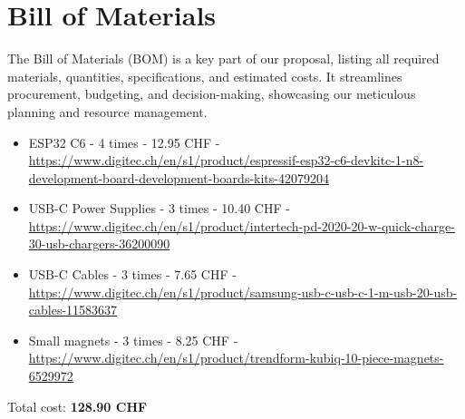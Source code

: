 \section{Bill of Materials}

The Bill of Materials (BOM) is a key part of our proposal, listing all required materials, quantities, specifications, and estimated costs.
It streamlines procurement, budgeting, and decision-making, showcasing our meticulous planning and resource management.

\begin{itemize}
    \item ESP32 C6 - 4 times - 12.95 CHF - \url{https://www.digitec.ch/en/s1/product/espressif-esp32-c6-devkitc-1-n8-development-board-development-boards-kits-42079204}
    \item USB-C Power Supplies - 3 times - 10.40 CHF - \url{https://www.digitec.ch/en/s1/product/intertech-pd-2020-20-w-quick-charge-30-usb-chargers-36200090}
    \item USB-C Cables - 3 times - 7.65 CHF - \url{https://www.digitec.ch/en/s1/product/samsung-usb-c-usb-c-1-m-usb-20-usb-cables-11583637}
    \item Small magnets - 3 times - 8.25 CHF - \url{https://www.digitec.ch/en/s1/product/trendform-kubiq-10-piece-magnets-6529972}
\end{itemize}

Total cost: \textbf{128.90 CHF}


